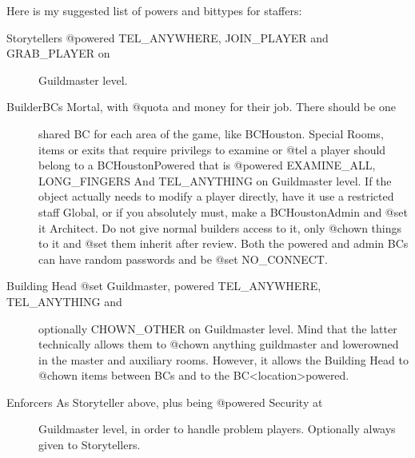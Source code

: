 \documentclass[letterpaper,10pt,english]{sphinxmanual}
\begin{document}
\sphinxAtStartPar
Here is my suggested list of powers and bittypes for staffers:
\begin{description}
\item[{Storytellers  \sphinxhyphen{} @powered TEL\_ANYWHERE, JOIN\_PLAYER and GRAB\_PLAYER on}] \leavevmode
\sphinxAtStartPar
Guildmaster level.

\item[{Builder\sphinxhyphen{}BCs   \sphinxhyphen{} Mortal, with @quota and money for their job. There should be one}] \leavevmode
\sphinxAtStartPar
shared BC for each area of the game, like BC\sphinxhyphen{}Houston. Special
Rooms, items or exits that require privilegs to examine or @tel
a player should belong to a BC\sphinxhyphen{}Houston\sphinxhyphen{}Powered that is @powered
EXAMINE\_ALL, LONG\_FINGERS And TEL\_ANYTHING on Guildmaster level.
If the object actually needs to modify a player directly, have
it use a restricted staff Global, or if you absolutely must,
make a BC\sphinxhyphen{}Houston\sphinxhyphen{}Admin and @set it Architect. Do not give
normal builders access to it, only @chown things to it and @set
them inherit after review.
Both the \sphinxhyphen{}powered and \sphinxhyphen{}admin BCs can have random passwords and
be @set NO\_CONNECT.

\item[{Building Head \sphinxhyphen{} @set Guildmaster, powered TEL\_ANYWHERE, TEL\_ANYTHING and}] \leavevmode
\sphinxAtStartPar
optionally CHOWN\_OTHER on Guildmaster level. Mind that the
latter technically allows them to @chown anything guildmaster\sphinxhyphen{}
and lower\sphinxhyphen{}owned in the master and auxiliary rooms. However,
it allows the Building Head to @chown items between BCs\sphinxhyphen{} and
to the BC\sphinxhyphen{}\textless{}location\textgreater{}\sphinxhyphen{}powered.

\item[{Enforcers     \sphinxhyphen{} As Storyteller above, plus being @powered Security at}] \leavevmode
\sphinxAtStartPar
Guildmaster level, in order to handle problem players.
Optionally always given to Storytellers.

\end{description}
\end{document}
